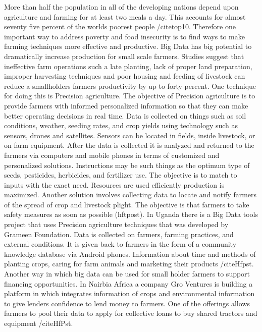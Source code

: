 \documentclass[sigconf]{acmart}
\begin{document}
{More than half the population in all of the developing nations depend upon agriculture and farming for at least two meals a day. This accounts for almost seventy five percent of the worlds poorest people /cite{top10}. Therefore one important way to address poverty and food insecurity is to find ways to make farming techniques more effective and productive. Big Data has big potential to dramatically increase production for small scale farmers. 
Studies suggest that ineffective farm operations such a late planting, lack of proper land preparation, improper harvesting techniques and poor housing and feeding of livestock can reduce a smallholders farmers productivity by up to forty percent. 
One technique for doing this is Precision agriculture. The objective of Precision agriculture is to provide farmers with informed personalized information so that they can make better operating decisions in real time. Data is collected on things such as soil conditions, weather, seeding rates, and crop yields using technology such as sensors, drones and satellites. Sensors can be located in fields, inside livestock, or on farm equipment.  After the data is collected it is analyzed and returned to the farmers via computers and mobile phones in terms of customized and personalized solutions. Instructions may be such things as the optimum type of seeds, pesticides, herbicides, and fertilizer use. The objective is to match to inputs with the exact need. Resources are used efficiently production is maximized. Another solution involves collecting data to locate and notify farmers of the spread of crop and livestock plight. The objective is that farmers to take safety measures as soon as possible (hftpost).
In Uganda there is a Big Data tools project that uses Precision agriculture techniques that was developed by Grameen Foundation. Data is collected on farmers, farming practices, and external conditions. It is given back to farmers in the form of a community knowledge database via Android phones. Information about time and methods of planting crops, caring for farm animals and marketing their products /cite{Hfpst}.
Another way in which big data can be used for small holder farmers to support financing opportunities. In Nairbia Africa a company Gro Ventures is building a platform in which integrates information of crops and environmental information to give lenders confidence to lend money to farmers. One of the offerings allows farmers to pool their data to apply for collective loans to buy shared tractors and equipment /cite{HfPst}.   


}
\end{document}
